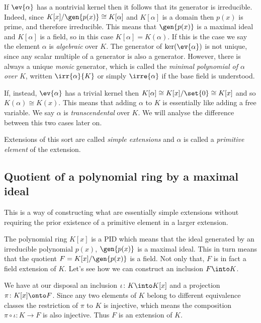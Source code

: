 \documentclass[12pt,oneside]{book}
\begin{document}
If \( \ev{\alpha} \) has a nontrivial kernel then it follows that its generator is
irreducible. Indeed, since \( K[x] / \gen{p(x)} \cong K[\alpha] \) and \( K[\alpha] \) is
a domain then \( p(x) \) is prime, and therefore irreducible. This means that \(
\gen{p(x)} \) is a maximal ideal and \( K[\alpha] \) is a field, so in this case \(
K[\alpha] = K(\alpha) \). If this is the case we say the element \( \alpha \) is \emph{algebraic}
over \( K \). The generator of \( \ker(\ev{\alpha}) \) is not unique, since any scalar
multiple of a generator is also a generator. However, there is always a unique
\emph{monic} generator, which is called the \emph{minimal polynomial of \( \alpha \) over
\( K \)}, written \( \irr{\alpha}{K} \) or simply \( \irre{\alpha} \) if the base field is
understood.

If, instead, \( \ev{\alpha} \) has a trivial kernel then \( K[\alpha] \cong K[x] / \set{0}
\cong K[x] \) and so \( K(\alpha) \cong K(x) \). This means that adding \( \alpha \) to \(
K \) is essentially like adding a free variable. We say \( \alpha \) is
\emph{transcendental} over \( K \). We will analyse the difference between this two cases
later on.

Extensions of this sort are called \emph{simple extensions} and \( \alpha \) is called a
\emph{primitive element} of the extension.

\subsection{Quotient of a polynomial ring by a maximal ideal}
This is a way of constructing what are essentially simple extensions without requiring the
prior existence of a primitive element in a larger extension.

The polynomial ring \( K[x] \) is a PID which means that the ideal generated by an irreducible
polynomial \( p(x) \), \( \gen{p(x)} \) is a maximal ideal. This in turn means that the
quotient \( F = K[x]/\gen{p(x)} \) is a field. Not only that, \( F \) is in fact a field
extension of \( K \). Let's see how we can construct an inclusion \( F \into K \).

We have at our disposal an inclusion \( \iota \colon K \into K[x] \) and a projection	\(
\pi \colon K[x] \onto F \). Since any two elements of \( K \) belong to different
equivalence classes the restriction of \( \pi \) to \( K \) is injective, which means the
composition \( \pi \circ \iota \colon K \to F \) is also injective. Thus \( F \) is an
extension of \( K \).
\end{document}
